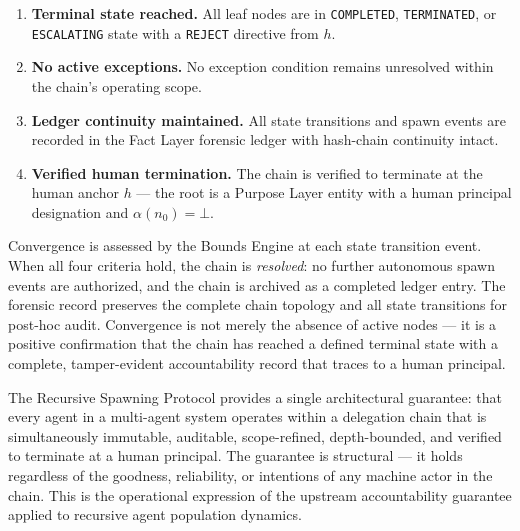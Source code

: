 \begin{enumerate}
    \item[(C1)] \textbf{Terminal state reached.} All leaf nodes are in \texttt{COMPLETED}, \texttt{TERMINATED}, or \texttt{ESCALATING} state with a \texttt{REJECT} directive from $h$.
    \item[(C2)] \textbf{No active exceptions.} No exception condition remains unresolved within the chain's operating scope.
    \item[(C3)] \textbf{Ledger continuity maintained.} All state transitions and spawn events are recorded in the Fact Layer forensic ledger with hash-chain continuity intact.
    \item[(C4)] \textbf{Verified human termination.} The chain is verified to terminate at the human anchor $h$ — the root is a Purpose Layer entity with a human principal designation and $\alpha(n_0) = \bot$.
\end{enumerate}

Convergence is assessed by the Bounds Engine at each state transition event. When all four criteria hold, the chain is \emph{resolved}: no further autonomous spawn events are authorized, and the chain is archived as a completed ledger entry. The forensic record preserves the complete chain topology and all state transitions for post-hoc audit. Convergence is not merely the absence of active nodes — it is a positive confirmation that the chain has reached a defined terminal state with a complete, tamper-evident accountability record that traces to a human principal.

\medskip

The Recursive Spawning Protocol provides a single architectural guarantee: that every agent in a multi-agent system operates within a delegation chain that is simultaneously immutable, auditable, scope-refined, depth-bounded, and verified to terminate at a human principal. The guarantee is structural — it holds regardless of the goodness, reliability, or intentions of any machine actor in the chain. This is the operational expression of the upstream \bxthree{} accountability guarantee applied to recursive agent population dynamics.
